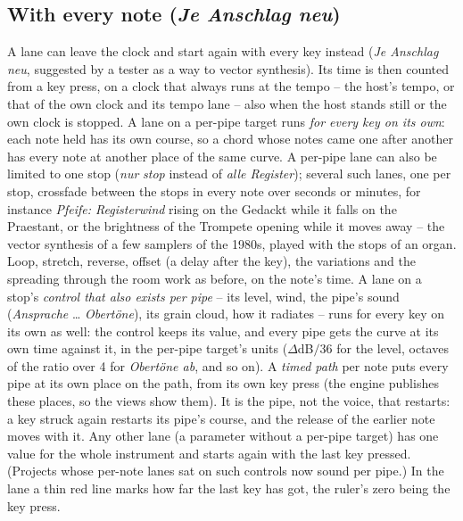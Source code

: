 \documentclass[11pt,a4paper,parskip=half,DIV=11,toc=bibliography]{scrartcl}
\newcommand{\ui}[1]{\emph{#1}}                 %
\begin{document}
\subsection{With every note (\ui{Je Anschlag neu})}
\label{sec:verlauf-pernote}
A lane can leave the clock and start again with every key instead (\ui{Je Anschlag neu}, suggested by a tester as a way to vector synthesis).
Its time is then counted from a key press, on a clock that always runs at the tempo -- the host's tempo, or that of the own clock and its tempo
lane -- also when the host stands still or the own clock is stopped. A lane on a per-pipe target runs \emph{for every key on its own}: each note
held has its own course, so a chord whose notes came one after another has every note at another place of the same curve. A per-pipe lane can also
be limited to one stop (\ui{nur} \emph{stop} instead of \ui{alle Register}); several such lanes, one per stop, crossfade between the stops in
every note over seconds or minutes, for instance \ui{Pfeife: Registerwind} rising on the Gedackt while it falls on the Praestant, or the brightness of
the Trompete opening while it moves away -- the vector synthesis of a few samplers of the 1980s, played with the stops of an organ. Loop, stretch,
reverse, offset (a delay after the key), the variations and the spreading through the room work as before, on the note's time. A lane on a stop's \emph{control that also exists per pipe} -- its level, wind, the pipe's sound (\ui{Ansprache} \ldots{}
\ui{Obertöne}), its grain cloud, how it radiates -- runs for every key on its own as well: the control keeps its value, and every pipe
gets the curve at its own time against it, in the per-pipe target's units ($\Delta$dB$/36$ for the level, octaves of the ratio over 4 for
\ui{Obertöne ab}, and so on). A \emph{timed path} per note puts every pipe at its own place on the path, from its own key press (the engine
publishes these places, so the views show them). It is the pipe, not the voice, that restarts: a key struck again restarts its pipe's
course, and the release of the earlier note moves with it. Any other lane (a parameter without a per-pipe target) has one value for the
whole instrument and starts again with the last key pressed. (Projects whose per-note lanes sat on such controls now sound per pipe.) In the lane a thin red line marks
how far the last key has got, the ruler's zero being the key press.
\end{document}
